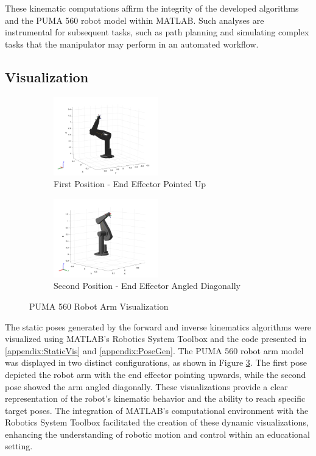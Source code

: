 \documentclass[conference]{IEEEtran}
\begin{document}
These kinematic computations affirm the integrity of the developed algorithms and the PUMA 560 robot model within MATLAB. Such analyses are instrumental for subsequent tasks, such as path planning and simulating complex tasks that the manipulator may perform in an automated workflow.

\subsection{Visualization}
\begin{figure}[H]
    \centering
    \begin{subfigure}{0.5\textwidth}
        \centering
        \includegraphics[width=0.5\textwidth]{pose1.png}
        \caption{First Position - End Effector Pointed Up}
        \label{fig:Pose1}
    \end{subfigure}
    \begin{subfigure}{0.5\textwidth}
        \centering
        \includegraphics[width=0.5\textwidth]{pose2.png}
        \caption{Second Position - End Effector Angled Diagonally}
        \label{fig:Pose2}
    \end{subfigure}
    \caption{PUMA 560 Robot Arm Visualization}
    \label{fig:Visualization}
\end{figure}

The static poses generated by the forward and inverse kinematics algorithms were visualized using MATLAB's Robotics System Toolbox and the code presented in \ref{appendix:StaticVis} and \ref{appendix:PoseGen}. The PUMA 560 robot arm model was displayed in two distinct configurations, as shown in Figure \ref{fig:Visualization}. The first pose depicted the robot arm with the end effector pointing upwards, while the second pose showed the arm angled diagonally. These visualizations provide a clear representation of the robot's kinematic behavior and the ability to reach specific target poses. The integration of MATLAB's computational environment with the Robotics System Toolbox facilitated the creation of these dynamic visualizations, enhancing the understanding of robotic motion and control within an educational setting.
\end{document}
